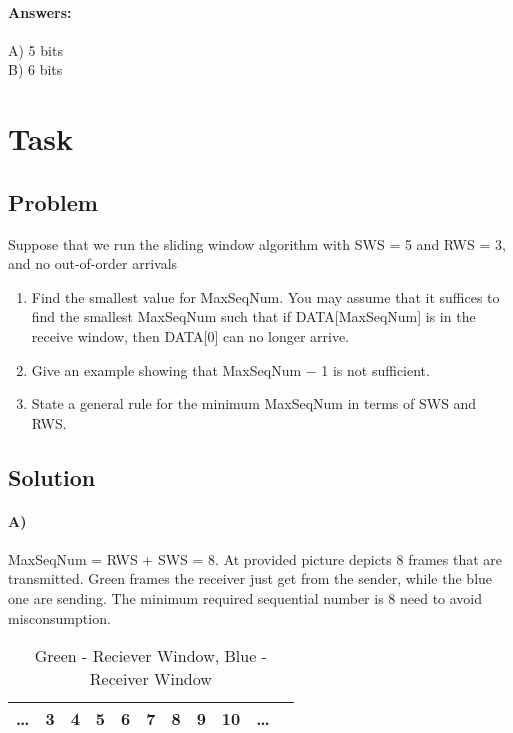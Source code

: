\documentclass[12pt]{article}
\begin{document}
        \paragraph{Answers:} A) 5 bits\\ \hspace*{62} B) 6 bits

    \newpage


    \section{Task}\label{sec:task-4}
    \subsection{Problem}
    Suppose that we run the sliding window algorithm with SWS = 5 and RWS = 3,
        and no out-of-order arrivals
        \begin{enumerate}[label=(\alph*)]
            \item Find the smallest value for MaxSeqNum.
            You may assume that it suffices to find the smallest MaxSeqNum such
            that if DATA[MaxSeqNum] is in the receive window, then DATA[0] can no longer arrive.
            \item Give an example showing that MaxSeqNum − 1 is not sufficient.
            \item State a general rule for the minimum MaxSeqNum in terms of SWS and RWS.
        \end{enumerate}


    \subsection{Solution}
        \paragraph{A)} MaxSeqNum = RWS + SWS = 8.
                At provided picture depicts 8 frames that are transmitted.
                Green frames the receiver just get from the sender, while the blue one are sending.
                The minimum required sequential number is 8 need to avoid misconsumption.
        \begin{table}[h]
                \centering
                    \begin{tabular}{|c|c|c|c|c|c|c|c|c|c|c|}
                        \hline
                        \dots & \cellcolor{green!30}3 & \cellcolor{green!30}4
                        & \cellcolor{green!30}5 & \cellcolor{blue!30}6 & \cellcolor{blue!30}7
                        & \cellcolor{blue!30}8 & \cellcolor{blue!30}9 & \cellcolor{blue!30}10 & \dots \\
                        \hline
                    \end{tabular}
                \caption{Green - Reciever Window, Blue - Receiver Window}
                \label{tab:my_table}
        \end{table}
\end{document}
